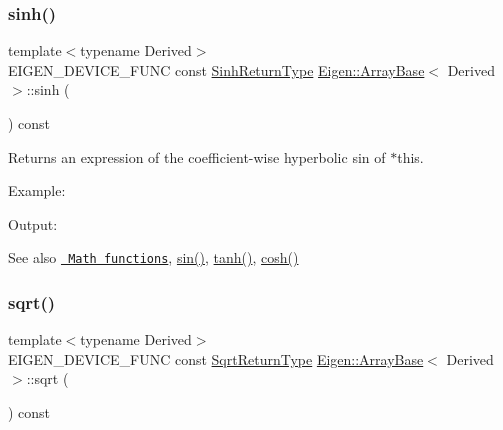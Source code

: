 \subsubsection{\texorpdfstring{sinh()}{sinh()}}
{\footnotesize\ttfamily template$<$typename Derived$>$ \\
E\+I\+G\+E\+N\+\_\+\+D\+E\+V\+I\+C\+E\+\_\+\+F\+U\+NC const \mbox{\hyperlink{class_eigen_1_1_cwise_unary_op}{Sinh\+Return\+Type}} \mbox{\hyperlink{class_eigen_1_1_array_base}{Eigen\+::\+Array\+Base}}$<$ Derived $>$\+::sinh (\begin{DoxyParamCaption}{ }\end{DoxyParamCaption}) const\hspace{0.3cm}{\ttfamily [inline]}}

\begin{DoxyReturn}{Returns}
an expression of the coefficient-\/wise hyperbolic sin of $\ast$this.
\end{DoxyReturn}
Example\+: 
\begin{DoxyCodeInclude}{0}
\end{DoxyCodeInclude}
 Output\+: 
\begin{DoxyVerbInclude}
\end{DoxyVerbInclude}


\begin{DoxySeeAlso}{See also}
\href{group__CoeffwiseMathFunctions.html\#cwisetable_sinh}{\texttt{ Math functions}}, \mbox{\hyperlink{class_eigen_1_1_array_base_a8f857f93533ac386282f47c5ef05459a}{sin()}}, \mbox{\hyperlink{class_eigen_1_1_array_base_a1e63179878d5a652fef566a67f5b4014}{tanh()}}, \mbox{\hyperlink{class_eigen_1_1_array_base_a5fd3dbcabcd2857db8f26ca5b321788f}{cosh()}} 
\end{DoxySeeAlso}
\mbox{\label{class_eigen_1_1_array_base_aef292634cdf57e09ee29c758deff8251}} 
\subsubsection{\texorpdfstring{sqrt()}{sqrt()}}
{\footnotesize\ttfamily template$<$typename Derived$>$ \\
E\+I\+G\+E\+N\+\_\+\+D\+E\+V\+I\+C\+E\+\_\+\+F\+U\+NC const \mbox{\hyperlink{class_eigen_1_1_cwise_unary_op}{Sqrt\+Return\+Type}} \mbox{\hyperlink{class_eigen_1_1_array_base}{Eigen\+::\+Array\+Base}}$<$ Derived $>$\+::sqrt (\begin{DoxyParamCaption}{ }\end{DoxyParamCaption}) const\hspace{0.3cm}{\ttfamily [inline]}}

